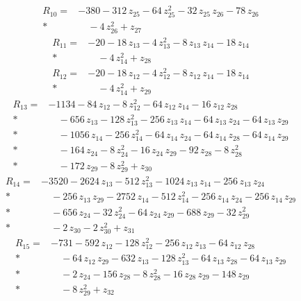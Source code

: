 \documentclass[10pt]{article}
\begin{document}
\begin{align*}
R_{10}={}& - 380 - 312\,z_{25} - 64\,z_{25}^{2} - 32\,z_{25}\,z_{26} - 78\,z_{26} \\*
&\quad - 4\,z_{26}^{2} + z_{27}
\end{align*}
\begin{align*}
R_{11}={}& - 20 - 18\,z_{13} - 4\,z_{13}^{2} - 8\,z_{13}\,z_{14} - 18\,z_{14} \\*
&\quad - 4\,z_{14}^{2} + z_{28}
\end{align*}
\begin{align*}
R_{12}={}& - 20 - 18\,z_{12} - 4\,z_{12}^{2} - 8\,z_{12}\,z_{14} - 18\,z_{14} \\*
&\quad - 4\,z_{14}^{2} + z_{29}
\end{align*}
\begin{align*}
R_{13}={}& - 1134 - 84\,z_{12} - 8\,z_{12}^{2} - 64\,z_{12}\,z_{14} - 16\,z_{12}\,z_{28} \\*
&\quad - 656\,z_{13} - 128\,z_{13}^{2} - 256\,z_{13}\,z_{14} - 64\,z_{13}\,z_{24} - 64\,z_{13}\,z_{29} \\*
&\quad - 1056\,z_{14} - 256\,z_{14}^{2} - 64\,z_{14}\,z_{24} - 64\,z_{14}\,z_{28} - 64\,z_{14}\,z_{29} \\*
&\quad - 164\,z_{24} - 8\,z_{24}^{2} - 16\,z_{24}\,z_{29} - 92\,z_{28} - 8\,z_{28}^{2} \\*
&\quad - 172\,z_{29} - 8\,z_{29}^{2} + z_{30}
\end{align*}
\begin{align*}
R_{14}={}& - 3520 - 2624\,z_{13} - 512\,z_{13}^{2} - 1024\,z_{13}\,z_{14} - 256\,z_{13}\,z_{24} \\*
&\quad - 256\,z_{13}\,z_{29} - 2752\,z_{14} - 512\,z_{14}^{2} - 256\,z_{14}\,z_{24} - 256\,z_{14}\,z_{29} \\*
&\quad - 656\,z_{24} - 32\,z_{24}^{2} - 64\,z_{24}\,z_{29} - 688\,z_{29} - 32\,z_{29}^{2} \\*
&\quad - 2\,z_{30} - 2\,z_{30}^{2} + z_{31}
\end{align*}
\begin{align*}
R_{15}={}& - 731 - 592\,z_{12} - 128\,z_{12}^{2} - 256\,z_{12}\,z_{13} - 64\,z_{12}\,z_{28} \\*
&\quad - 64\,z_{12}\,z_{29} - 632\,z_{13} - 128\,z_{13}^{2} - 64\,z_{13}\,z_{28} - 64\,z_{13}\,z_{29} \\*
&\quad - 2\,z_{24} - 156\,z_{28} - 8\,z_{28}^{2} - 16\,z_{28}\,z_{29} - 148\,z_{29} \\*
&\quad - 8\,z_{29}^{2} + z_{32}
\end{align*}
\end{document}
